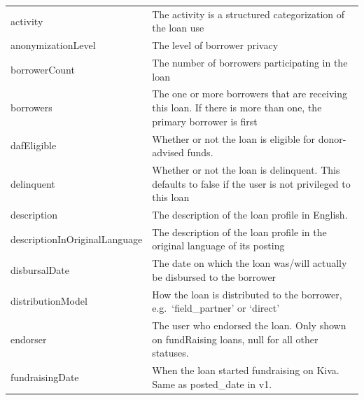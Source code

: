 \begin{longtable}{|p{}|p{}|}
	activity                             & The activity is a structured categorization of the loan
	use                                                                                                      \\
	anonymizationLevel                   & The level of borrower privacy                                     \\
	borrowerCount                        & The number of borrowers participating in the loan                 \\
	borrowers                            & The one or more borrowers that are receiving this loan. If
	there is more than one, the primary borrower is first                                                    \\
	dafEligible                          & Whether or not the loan is eligible for donor-advised
	funds.                                                                                                   \\
	delinquent                           & Whether or not the loan is delinquent. This defaults to
	false if the user is not privileged to this loan                                                         \\
	description                          & The description of the loan profile in English.                   \\
	descriptionInOriginalLanguage        & The description of the loan profile in
	the original language of its posting                                                                     \\
	disbursalDate                        & The date on which the loan was/will actually be
	disbursed to the borrower                                                                                \\
	distributionModel                    & How the loan is distributed to the borrower,
	e.g.~`field\_partner' or `direct'                                                                        \\
	endorser                             & The user who endorsed the loan. Only shown on fundRaising
	loans, null for all other statuses.                                                                      \\
	fundraisingDate                      & When the loan started fundraising on Kiva. Same as
	posted\_date in v1.                                                                                      \\

\end{longtable}
